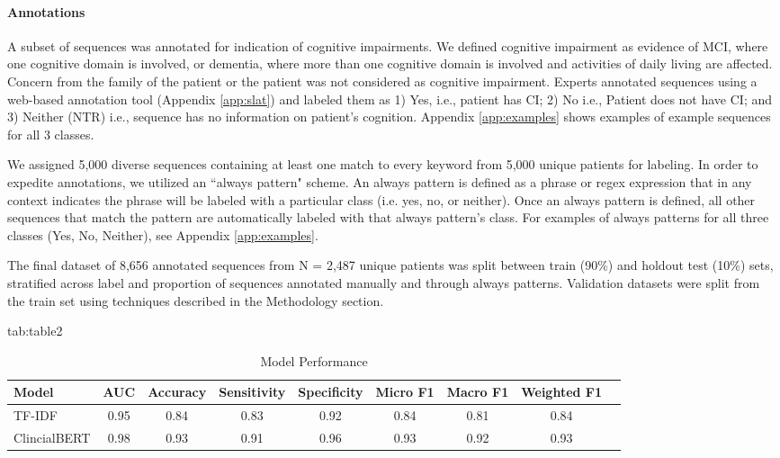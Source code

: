 \documentclass[pmlr,twocolumn,10pt]{jmlr} %
\begin{document}
\paragraph{Annotations}
\label{sec:Annotations} A subset of sequences was annotated for indication of cognitive impairments. We defined cognitive impairment as evidence of MCI, where one cognitive domain is involved, or dementia, where more than one cognitive domain is involved and activities of daily living are affected. Concern from the family of the patient or the patient was not considered as cognitive impairment. Experts annotated sequences using a web-based annotation tool (Appendix \ref{app:slat}) and labeled them as 1) Yes, i.e., patient has CI; 2) No i.e., Patient does not have CI; and 3) Neither (NTR) i.e., sequence has no information on patient’s cognition. Appendix \ref{app:examples} shows examples of example sequences for all 3 classes.

We assigned 5,000 diverse sequences containing at least one match to every keyword from 5,000 unique patients for labeling. In order to expedite annotations, we utilized an “always pattern" scheme. An always pattern is defined as a phrase or regex expression that in any context indicates the phrase will be labeled with a particular class (i.e. yes, no, or neither). Once an always pattern is defined, all other sequences that match the pattern are automatically labeled with that always pattern's class. For examples of always patterns for all three classes (Yes, No, Neither), see Appendix \ref{app:examples}. 

The final dataset of 8,656 annotated sequences from N = 2,487 unique patients was split between train (90\%) and holdout test (10\%) sets, stratified across label and proportion of sequences annotated manually and through always patterns. Validation datasets were split from the train set using techniques described in the Methodology section. 

\begin{table*}[hbtp]
\floatconts
{tab:table2}
{\caption{Model Performance}}
\centering
  {
  \begin{tabular}{lcccccccc}
    \toprule 
    \bfseries Model & \bfseries AUC & \bfseries Accuracy & \bfseries Sensitivity & \bfseries Specificity & \bfseries Micro F1  & \bfseries Macro F1 & \bfseries Weighted F1 \\ 
    \midrule
    TF-IDF & 0.95 & 0.84 & 0.83 & 0.92 & 0.84 & 0.81 & 0.84 \\
    ClincialBERT & 0.98 & 0.93 & 0.91 & 0.96 & 0.93 & 0.92 & 0.93 \\
    \bottomrule
  \end{tabular}
  }

  \label{tab:modelperf}
\end{table*}
\end{document}
